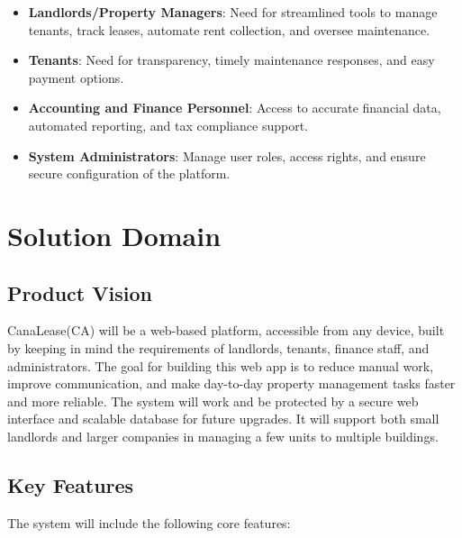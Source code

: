 \documentclass[12pt]{article}
\begin{document}
\begin{itemize}
    \item \textbf{Landlords/Property Managers}: Need for streamlined tools to manage tenants, track leases, automate rent collection, and oversee maintenance.
    \item \textbf{Tenants}: Need for transparency, timely maintenance responses, and easy payment options.
    \item \textbf{Accounting and Finance Personnel}: Access to accurate financial data, automated reporting, and tax compliance support.
    \item \textbf{System Administrators}: Manage user roles, access rights, and ensure secure configuration of the platform.
\end{itemize}

\section{Solution Domain}

\subsection{Product Vision}
CanaLease(CA) will be a web-based platform, accessible from any device, built by keeping in mind the requirements of landlords, tenants, finance staff, and administrators. The goal for building this web app is to reduce manual work, improve communication, and make day-to-day property management tasks faster and more reliable. The system will work and be protected by a secure web interface and scalable database for future upgrades. It will support both small landlords and larger companies in managing a few units to multiple buildings.  

\subsection{Key Features}
The system will include the following core features:
\end{document}
